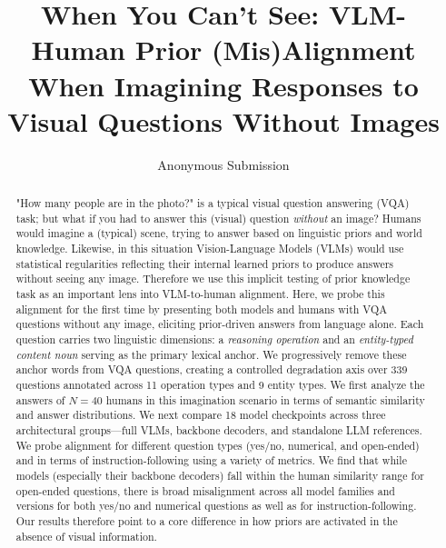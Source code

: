 \documentclass[letterpaper]{article}
\title{When You Can't See: VLM-Human Prior (Mis)Alignment When Imagining Responses to Visual Questions Without Images}
\author{Anonymous Submission}
\begin{document}
\maketitle

\begin{abstract}
"How many people are in the photo?" is a typical visual question answering (VQA) task; but what if you had to answer this (visual) question \emph{without} an image? Humans would imagine a (typical) scene, trying to answer based on linguistic priors and world knowledge. Likewise, in this situation Vision-Language Models (VLMs) would use statistical regularities reflecting their internal learned priors to produce answers without seeing any image. Therefore we use this implicit testing of prior knowledge task as an important lens into VLM-to-human alignment. 
Here, we probe this alignment for the first time by presenting both models and humans with VQA questions without any image, eliciting prior-driven answers from language alone. Each question carries two linguistic dimensions: a \emph{reasoning operation} and an \emph{entity-typed content noun} serving as the primary lexical anchor. We progressively remove these anchor words from VQA questions, creating a controlled degradation axis over 339 questions annotated across 11 operation types and 9 entity types.
We first analyze the answers of $N=40$ humans in this imagination scenario in terms of semantic similarity and answer distributions. We next compare 18 model checkpoints across three architectural groups---full VLMs, backbone decoders, and standalone LLM references. We probe alignment for different question types (yes/no, numerical, and open-ended) and in terms of instruction-following using a variety of metrics.
We find that while models (especially their backbone decoders) fall within the human similarity range for open-ended questions, there is broad misalignment across all model families and versions for both yes/no and numerical questions as well as for instruction-following.
Our results therefore point to a core difference in how priors are activated in the absence of visual information.

\end{abstract}
\end{document}
